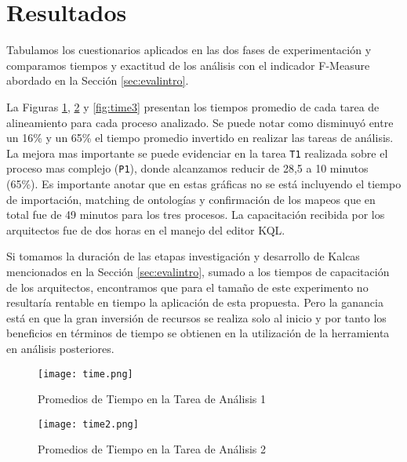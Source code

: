 \section{Resultados} \label{sec:evalresults}

Tabulamos los cuestionarios aplicados en las dos fases de experimentaci\'on y comparamos tiempos y exactitud de los an\'alisis con el indicador F-Measure abordado en la Secci\'on \ref{sec:evalintro}. 

La Figuras \ref{fig:time}, \ref{fig:time2} y \ref{fig:time3} presentan los tiempos promedio de cada tarea de alineamiento para cada proceso analizado. Se puede notar como disminuy\'o entre un 16\% y un 65\% el tiempo promedio invertido en realizar las tareas de an\'alisis. La mejora mas importante se puede evidenciar en la tarea \texttt{T1} realizada sobre el proceso mas complejo (\texttt{P1}), donde alcanzamos reducir de 28,5 a 10 minutos (65\%). Es importante anotar que en estas gr\'aficas no se est\'a incluyendo el tiempo de importaci\'on, matching de ontolog\'ias y confirmaci\'on de los mapeos que en total fue de 49 minutos para los tres procesos. La capacitaci\'on recibida por los arquitectos fue de dos horas en el manejo del editor KQL. 

Si tomamos la duraci\'on de las etapas investigaci\'on y desarrollo de Kalcas mencionados en la Secci\'on \ref{sec:evalintro}, sumado a los tiempos de capacitaci\'on de los arquitectos, encontramos que para el tama\~no de este experimento no resultar\'ia rentable en tiempo la aplicaci\'on de esta propuesta. Pero la ganancia est\'a en que la gran inversi\'on de recursos se realiza solo al inicio y por tanto los beneficios en t\'erminos de tiempo se obtienen en la utilizaci\'on de la herramienta en an\'alisis posteriores.


\begin{figure}[!t]
\begin{center}
	\texttt{[image: time.png]}
	\caption{Promedios de Tiempo en la Tarea de An\'alisis 1}
	\label{fig:time}
\end{center}
\end{figure}

\begin{figure}[!t]
\begin{center}
	\texttt{[image: time2.png]}
	\caption{Promedios de Tiempo en la Tarea de An\'alisis 2}
	\label{fig:time2}
\end{center}
\end{figure}

